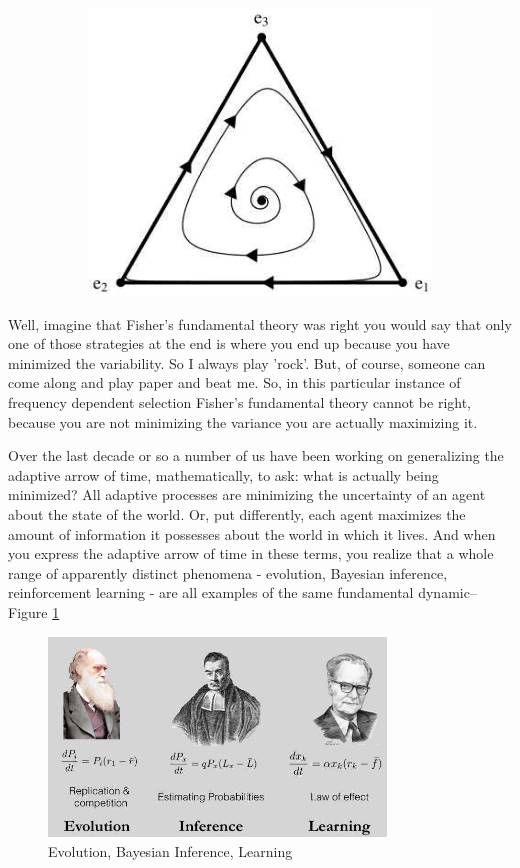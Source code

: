 \documentclass[]{article}
\begin{document}
\begin{figure}[H]
\begin{subfigure}[t]{0.3\textwidth}
		\includegraphics[width=\textwidth]{rockpaperscissors-evolution}
	\end{subfigure}
\end{figure}
Well, imagine that Fisher's fundamental theory was right
you would say that only one of those strategies at the end is where you end up
because you have minimized the variability.
So I always play 'rock'.
But, of course, someone can come along and play paper and beat me.
So, in this particular instance of frequency dependent selection
Fisher's fundamental theory cannot be right,
because you are not minimizing the variance
you are actually maximizing it.

Over the last decade or so a number of us have been working on generalizing the adaptive arrow of time, mathematically, to ask: what is actually being minimized?
All adaptive processes are minimizing
the uncertainty of an agent about the state of the world. Or, put differently, each agent maximizes the amount of information it possesses about the world in which it lives.
And when you express the adaptive arrow of time in these terms,
you realize that a whole range of apparently distinct phenomena
- evolution, Bayesian inference, reinforcement learning -
are all examples of the same fundamental dynamic--Figure \ref{fig:evolution-inference-learning}
\begin{figure}[H]
	\caption{Evolution, Bayesian Inference, Learning}\label{fig:evolution-inference-learning}
	\includegraphics[width=0.8\textwidth]{evolution-inference-learning}
\end{figure}
\end{document}
